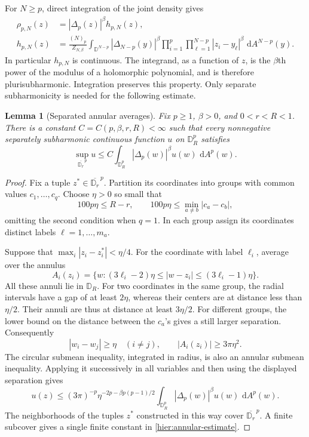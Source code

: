 \documentclass[11pt,a4paper]{article}
\numberwithin{equation}{section}
\newtheorem{lemma}[theorem]{Lemma}
\theoremstyle{definition}
\theoremstyle{remark}
\newcommand{\D}{\mathbb D}
\newcommand{\dd}{\,\mathrm d}
\begin{document}
For $N\ge p$, direct integration of the joint density gives
\begin{align}
 \rho_{p,N}(z)&=|\Delta_p(z)|^\beta h_{p,N}(z),
 \label{hier:finite-factorization}\\
 h_{p,N}(z)
 &=\frac{(N)_p}{Z_{N,\beta}}
   \int_{\D^{N-p}}|\Delta_{N-p}(y)|^\beta
   \prod_{i=1}^p\prod_{\ell=1}^{N-p}|z_i-y_\ell|^\beta
   \,\dd A^{N-p}(y).
 \label{hier:h-definition}
\end{align}
In particular $h_{p,N}$ is continuous.  The integrand, as a function of
$z$, is the $\beta$th power of the modulus of a holomorphic polynomial,
and is therefore plurisubharmonic.  Integration preserves this property.
Only separate subharmonicity is needed for the following estimate.

\begin{lemma}[Separated annular averages]
\label{hier:annular-lemma}
Fix $p\ge1$, $\beta>0$, and $0<r<R<1$.  There is a constant
$C=C(p,\beta,r,R)<\infty$ such that every nonnegative separately
subharmonic continuous function $u$ on $\D_R^p$ satisfies
\begin{equation}
 \sup_{\overline{\D_r}^{\,p}}u
 \le C\int_{\D_R^p}|\Delta_p(w)|^\beta u(w)\,\dd A^p(w).
 \label{hier:annular-estimate}
\end{equation}
\end{lemma}

\begin{proof}
Fix a tuple $z^*\in\overline{\D_r}^{\,p}$.  Partition its coordinates
into groups with common values $c_1,\ldots,c_q$.  Choose $\eta>0$ so
small that
\[
 100p\eta\le R-r,
 \qquad
 100p\eta\le\min_{a\ne b}|c_a-c_b|,
\]
omitting the second condition when $q=1$.  In each group assign its
coordinates distinct labels $\ell=1,\ldots,m_a$.

Suppose that $\max_i|z_i-z_i^*|<\eta/4$.  For the coordinate with
label $\ell_i$, average over the annulus
\[
 A_i(z_i)=\{w:(3\ell_i-2)\eta\le|w-z_i|
                         \le(3\ell_i-1)\eta\}.
\]
All these annuli lie in $\D_R$.  For two coordinates in the same group,
the radial intervals have a gap of at least $2\eta$, whereas their
centers are at distance less than $\eta/2$.  Their annuli are thus at
distance at least $3\eta/2$.  For different groups, the lower bound on
the distance between the $c_a$'s gives a still larger separation.
Consequently
\[
 |w_i-w_j|\ge\eta\quad(i\ne j),
 \qquad |A_i(z_i)|\ge3\pi\eta^2.
\]
The circular submean inequality, integrated in radius, is also an
annular submean inequality.  Applying it successively in all variables
and then using the displayed separation gives
\[
 u(z)\le
 (3\pi)^{-p}\eta^{-2p-\beta p(p-1)/2}
 \int_{\D_R^p}|\Delta_p(w)|^\beta u(w)\,\dd A^p(w).
\]
The neighborhoods of the tuples $z^*$ constructed in this way cover
$\overline{\D_r}^{\,p}$.  A finite subcover gives a single finite
constant in \eqref{hier:annular-estimate}.
\end{proof}
\end{document}
